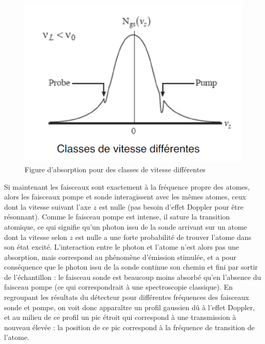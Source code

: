 \begin{figure}[htp]
    \centering
    \includegraphics[scale=1.0]{Images2/Vitesse2.PNG}
    \caption{Figure d'absorption pour des classes de vitesse différentes}
\label{fig:vit2}
\end{figure}

Si maintenant les faisceaux sont exactement à la fréquence propre des atomes, alors les faisceaux pompe et sonde interagissent avec les mêmes atomes, ceux dont la vitesse suivant l'axe $z$ est nulle (pas besoin d'effet Doppler pour être résonnant). Comme le faisceau pompe est intense, il sature la transition atomique, ce qui signifie qu'un photon issu de la sonde arrivant sur un atome dont la vitesse selon $z$ est nulle a une forte probabilité de trouver l'atome dans son état excité. L'interaction entre le photon et l'atome n'est alors pas une absorption, mais correspond au phénomène d'émission stimulée, et a pour conséquence que le photon issu de la sonde continue son chemin et fini par sortir de l'échantillon : le faisceau sonde est beaucoup moins absorbé qu'en l'absence du faisceau pompe (ce qui correspondrait à une spectroscopie classique). En regroupant les résultats du détecteur pour différentes fréquences des faisceaux sonde et pompe, on voit donc apparaître un profil gaussien dû à l'effet Doppler, et au milieu de ce profil un pic étroit qui correspond à une transmission à nouveau élevée : la position de ce pic correspond à la fréquence de transition de l'atome.

